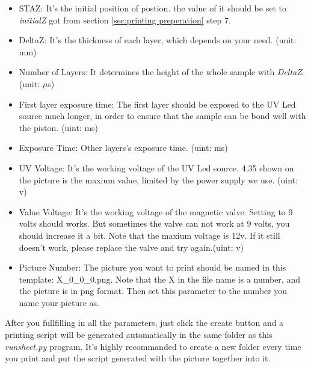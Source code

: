 \documentclass[a4paper]{article}
\begin{document}
\begin{itemize}
  \item STAZ: It's the initial position of postion. the value of it should be set to \textit{initialZ} got from section 
  \ref{sec:printing preperation} step 7.
  \item DeltaZ: It's the thickness of each layer, which depends on your need. (unit: mm)
  \item Number of Layers: It determines the height of the whole sample with \textit{DeltaZ}. (unit: $\mu$s)
  \item First layer exposure time: The first layer should be exposed to the UV Led source much longer, in order to ensure 
  that the sample can be bond well with the piston. (uint: ms)
  \item Exposure Time: Other layers's exposure time. (uint: ms)
  \item UV Voltage: It's the working voltage of the UV Led source. 4.35 shown on the picture is the maxium value, limited by the 
  power supply we use.  (uint: v)
  \item Value Voltage: It's the working voltage of the magnetic valve. Setting to 9 volts should works. But sometimes the valve 
  can not work at 9 volts, you should increase it a bit. Note that the maxium voltage is 12v. If it still doesn't work, 
  please replace the valve and try again.(uint: v)
  \item Picture Number: The picture you want to print should be named in this template: X\_0\_0\_0.png. Note that the X in the file 
  name is a number, and the picture is in png format. Then set this parameter to the number you name your picture as. 
\end{itemize}
After you fullfilling in all the parameters, just click the create button and a printing script will be generated automatically in 
the same folder as this \textit{runsheet.py} program. It's highly recommanded to create a new folder every time you print and put 
the script generated with the picture together into it.
\end{document}
